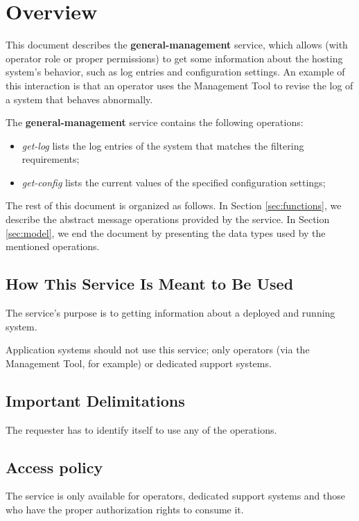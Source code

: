 \documentclass[a4paper]{arrowhead}
\begin{document}
\section{Overview}
\label{sec:overview}
This document describes the \textbf{general-management} service, which allows (with operator role or proper permissions) to get some information about the hosting system's behavior, such as log entries and configuration settings. An example of this interaction is that an operator uses the Management Tool to revise the log of a system that behaves abnormally.

The \textbf{general-management} service contains the following operations:

\begin{itemize}
    \item \textit{get-log} lists the log entries of the system that matches the filtering requirements;
    \item \textit{get-config} lists the current values of the specified configuration settings;
\end{itemize}

The rest of this document is organized as follows.
In Section \ref{sec:functions}, we describe the abstract message operations provided by the service.
In Section \ref{sec:model}, we end the document by presenting the data types used by the mentioned operations.

\subsection{How This Service Is Meant to Be Used}
The service's purpose is to getting information about a deployed and running system. 

Application systems should not use this service; only operators (via the Management Tool, for example) or dedicated support systems.

\subsection{Important Delimitations}
\label{sec:delimitations}

The requester has to identify itself to use any of the operations.

\subsection{Access policy}
\label{sec:accesspolicy}

The service is only available for operators, dedicated support systems and those who have the proper authorization rights to consume it.
\end{document}
